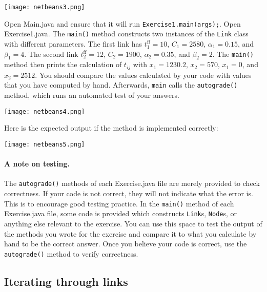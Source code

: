 \documentclass[12pt]{article}
\begin{document}
	\begin{center}
		\texttt{[image: netbeans3.png]}
	\end{center}

\noindent Open Main.java and ensure that it will run \texttt{Exercise1.main(args);}.
Open Exercise1.java. The \texttt{main()} method constructs two instances of the \texttt{Link} class with different parameters. The first link has $t^{\mathrm{ff}}_{1}=10$, $C_{1}=2580$, $\alpha_{1}=0.15$, and $\beta_{1}=4$. The second link $t^{\mathrm{ff}}_{2}=12$, $C_{2}=1900$, $\alpha_{2}=0.35$, and $\beta_{2}=2$. The \texttt{main()} method then prints the calculation of $t_{ij}$ with $x_{1}=1230.2$, $x_2=570$, $x_1=0$, and $x_2=2512$. You should compare the values calculated by your code with values that you have computed by hand. 
Afterwards, \texttt{main} calls the \texttt{autograde()} method, which runs an automated test of your answers. 
	
	
	\begin{center}
	\texttt{[image: netbeans4.png]}
\end{center}
	
Here is the expected output if the method is implemented correctly:


	\begin{center}
	\texttt{[image: netbeans5.png]}
\end{center}	
	
	
	\paragraph*{A note on testing.} The \texttt{autograde()} methods of each Exercise.java file are merely provided to check correctness. If your code is not correct, they will not indicate what the error is. This is to encourage good testing practice. In the \texttt{main()} method of each Exercise.java file, some code is provided which constructs \texttt{Link}s, \texttt{Node}s, or anything else relevant to the exercise. You can use this space to test the output of the methods you wrote for the exercise and compare it to what you calculate by hand to be the correct answer. Once you believe your code is correct, use the \texttt{autograde()} method to verify correctness.
	
	
	
\subsection{Iterating through links}
\label{sec22}	
	
\end{document}
